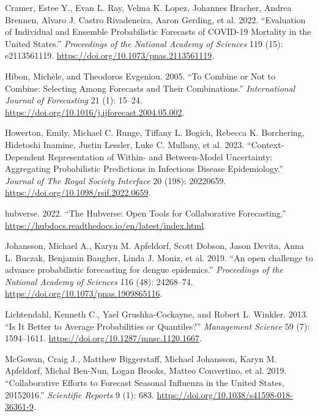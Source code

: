 \documentclass[
]{article}
\newlength{\cslhangindent}
\newenvironment{CSLReferences}[2] %
 {\begin{list}{}{%
  \setlength{\itemindent}{0pt}
  \setlength{\leftmargin}{0pt}
  \setlength{\parsep}{0pt}
  \ifodd #1
   \setlength{\leftmargin}{\cslhangindent}
   \setlength{\itemindent}{-1\cslhangindent}
  \fi
  \setlength{\itemsep}{#2\baselineskip}}}
 {\end{list}}
\begin{document}
\begin{CSLReferences}{1}{0}
Cramer, Estee Y., Evan L. Ray, Velma K. Lopez, Johannes Bracher, Andrea
Brennen, Alvaro J. Castro Rivadeneira, Aaron Gerding, et al. 2022.
{``Evaluation of Individual and Ensemble Probabilistic Forecasts of
COVID-19 Mortality in the United States.''} \emph{Proceedings of the
National Academy of Sciences} 119 (15): e2113561119.
\url{https://doi.org/10.1073/pnas.2113561119}.

Hibon, Michèle, and Theodoros Evgeniou. 2005. {``To Combine or Not to
Combine: Selecting Among Forecasts and Their Combinations.''}
\emph{International Journal of Forecasting} 21 (1): 15--24.
\url{https://doi.org/10.1016/j.ijforecast.2004.05.002}.

Howerton, Emily, Michael C. Runge, Tiffany L. Bogich, Rebecca K.
Borchering, Hidetoshi Inamine, Justin Lessler, Luke C. Mullany, et al.
2023. {``Context-Dependent Representation of Within- and Between-Model
Uncertainty: Aggregating Probabilistic Predictions in Infectious Disease
Epidemiology.''} \emph{Journal of The Royal Society Interface} 20 (198):
20220659. \url{https://doi.org/10.1098/rsif.2022.0659}.

hubverse. 2022. {``The Hubverse: Open Tools for Collaborative
Forecasting.''}
\url{https://hubdocs.readthedocs.io/en/latest/index.html}.

Johansson, Michael A., Karyn M. Apfeldorf, Scott Dobson, Jason Devita,
Anna L. Buczak, Benjamin Baugher, Linda J. Moniz, et al. 2019. {``An
open challenge to advance probabilistic forecasting for dengue
epidemics.''} \emph{Proceedings of the National Academy of Sciences} 116
(48): 24268--74. \url{https://doi.org/10.1073/pnas.1909865116}.

Lichtendahl, Kenneth C., Yael Grushka-Cockayne, and Robert L. Winkler.
2013. {``Is It Better to Average Probabilities or Quantiles?''}
\emph{Management Science} 59 (7): 1594--1611.
\url{https://doi.org/10.1287/mnsc.1120.1667}.

McGowan, Craig J., Matthew Biggerstaff, Michael Johansson, Karyn M.
Apfeldorf, Michal Ben-Nun, Logan Brooks, Matteo Convertino, et al. 2019.
{``Collaborative Efforts to Forecast Seasonal Influenza in the United
States, 2015{\textendash}2016.''} \emph{Scientific Reports} 9 (1): 683.
\url{https://doi.org/10.1038/s41598-018-36361-9}.


\end{CSLReferences}
\end{document}
